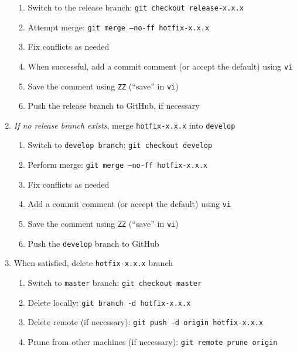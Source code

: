 \documentclass{article}
\begin{document}
\begin{enumerate}
\begin{enumerate}
    \item Switch to the release branch: \texttt{git checkout release-x.x.x} 

    \item Attempt merge: \texttt{git merge --no-ff hotfix-x.x.x}
	
	\item Fix conflicts as needed
	
	\item When successful, add a commit comment (or accept the default) using \texttt{vi} 
	
	\item Save the comment using \texttt{ZZ} (``save'' in \texttt{vi})
	
	\item Push the release branch to GitHub, if necessary

  \end{enumerate}
  \item \emph{If no release branch exists}, merge \texttt{hotfix-x.x.x} into \texttt{develop} 
  \begin{enumerate}

    \item Switch to \texttt{develop branch}: \texttt{git checkout develop} 

    \item Perform merge: \texttt{git merge --no-ff hotfix-x.x.x} 
	
	\item Fix conflicts as needed
	
	\item Add a commit comment (or accept the default) using \texttt{vi} 
	
	\item Save the comment using \texttt{ZZ} (``save'' in \texttt{vi})
	
	\item Push the \texttt{develop} branch to GitHub 

  \end{enumerate}
  \item When satisfied, delete \texttt{hotfix-x.x.x} branch
  \begin{enumerate}

    \item Switch to \texttt{master} branch: \texttt{git checkout master}

    \item Delete locally: \texttt{git branch -d hotfix-x.x.x}

    \item Delete remote (if necessary): \texttt{git push -d origin hotfix-x.x.x} 

	\item Prune from other machines (if necessary): \texttt{git remote prune origin} 

  \end{enumerate}
  

\end{enumerate}
\end{document}

